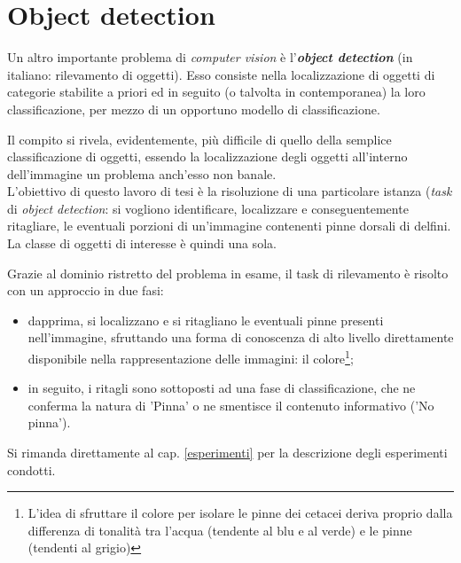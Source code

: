 \section{Object detection}
Un altro importante problema di \textit{computer vision} è l'\textbf{\textit{object detection}} (in italiano: rilevamento di oggetti). Esso consiste nella localizzazione di oggetti di categorie stabilite a priori ed in seguito (o talvolta in contemporanea) la loro classificazione, per mezzo di un opportuno modello di classificazione.

Il compito si rivela, evidentemente, più difficile di quello della semplice classificazione di oggetti, essendo la localizzazione degli oggetti all'interno dell'immagine un problema anch'esso non banale.\\

L'obiettivo di questo lavoro di tesi è la risoluzione di una particolare istanza (\textit{task} di \textit{object detection}: si vogliono identificare, localizzare e conseguentemente ritagliare, le eventuali porzioni di un'immagine contenenti pinne dorsali di delfini. La classe di oggetti di interesse è quindi una sola.

Grazie al dominio ristretto del problema in esame, il task di rilevamento è risolto con un approccio in due fasi:
\begin{itemize}
\item dapprima, si localizzano e si ritagliano le eventuali pinne presenti nell'immagine, sfruttando una forma di conoscenza di alto livello direttamente disponibile nella rappresentazione delle immagini: il colore\footnote{L'idea di sfruttare il colore per isolare le pinne dei cetacei deriva proprio dalla differenza di tonalità tra l'acqua (tendente al blu e al verde) e le pinne (tendenti al grigio)};
\item in seguito, i ritagli sono sottoposti ad una fase di classificazione, che ne conferma la natura di 'Pinna' o ne smentisce il contenuto informativo ('No pinna').
\end{itemize}
Si rimanda direttamente al cap. \ref{esperimenti} per la descrizione degli esperimenti condotti.